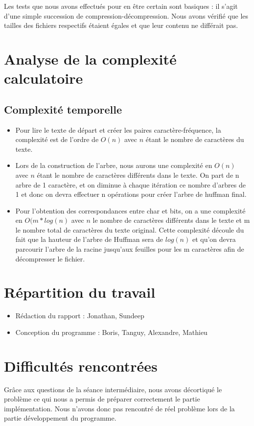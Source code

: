 \documentclass[11pt]{article}
\begin{document}
Les tests que nous avons effectués pour en être certain sont basiques : il s'agit d'une simple succession de compression-décompression. Nous avons vérifié que les tailles des fichiers respectifs étaient égales et que leur contenu ne différait pas. \\

\section{Analyse de la complexité calculatoire}
\subsection{Complexité temporelle}
\begin{itemize}
\item Pour lire le texte de départ et créer les paires caractère-fréquence, la complexité est de l'ordre de $O(n)$ avec $n$ étant le nombre de caractères du texte.
\item Lors de la construction de l'arbre, nous aurons une complexité en $O(n)$ avec $n$ étant le nombre de caractères différents dans le texte. On part de n arbre de 1 caractère, et on diminue à chaque itération ce nombre d'arbres de 1 et donc on devra effectuer n opérations pour créer l'arbre de huffman final.
\item Pour l'obtention des correspondances entre char et bits, on a une complexité en $O(m*log(n)$ avec $n$ le nombre de caractères différents dans le texte et m le nombre total de caractères du texte original. Cette complexité découle du fait que la hauteur de l'arbre de Huffman sera de $log(n)$ et qu'on devra parcourir l'arbre de la racine jusqu'aux feuilles pour les m caractères afin de décompresser le fichier.
\end{itemize}

\section{Répartition du travail}

\begin{itemize}
\item Rédaction du rapport : Jonathan, Sundeep
\item Conception du programme : Boris, Tanguy, Alexandre, Mathieu
\end{itemize}

\section{Difficultés rencontrées}
Grâce aux questions de la séance intermédiaire, nous avons décortiqué le problème ce qui nous a permis de préparer correctement le partie implémentation. Nous n'avons donc pas rencontré de réel problème lors de la partie développement du programme.
\end{document}
